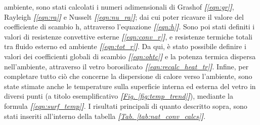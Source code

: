 \documentclass[a4paper,10pt]{article}                                                                                       %
\begin{document}
  ambiente, sono stati calcolati i numeri adimensionali di Grashof \textit{\textbf{[}\ref{eqn:gr}\textbf{]}}, Rayleigh
  \textit{\textbf{[}\ref{eqn:ra}\textbf{]}} e Nusselt \textit{\textbf{[}\ref{eqn:nu_ra}\textbf{]}}; dai cui poter
  ricavare il valore del coefficiente di scambio h, attraverso l'equazione \textit{\textbf{[}\ref{eqn:h}\textbf{]}}.
  Sono poi stati definiti i valori di resistenze convettive esterne \textit{\textbf{[}\ref{eqn:conv_r}\textbf{]}}, e
  resistenze termiche totali tra fluido esterno ed ambiente \textit{\textbf{[}\ref{eqn:tot_r}\textbf{]}}. Da qui, è
  stato possibile definire i valori dei coefficienti globali di scambio
  \textit{\textbf{[}\ref{eqn:ohtc}\textbf{]}} e la potenza termica dispersa nell'ambiente, attraverso il vetro
  borosilicato \textit{\textbf{[}\ref{eqn:recalc_heat_tr}\textbf{]}}. Infine, per completare tutto ciò che concerne
  la dispersione di calore verso l'ambiente, sono state stimate anche le temperature sulla superficie interna ed
  esterna del vetro in diversi punti (a titolo esemplificativo
  \textit{\textbf{[}\hyperref[fig:temp_trend]{Fig. }\ref{fig:temp_trend}\textbf{]}}), mediante la formula
  \textit{\textbf{[}\ref{eqn:surf_temp}\textbf{]}}. I risultati principali di quanto descritto sopra, sono stati
  inseriti all'interno della tabella
  \textit{\textbf{[}\hyperref[tab:nat_conv_calcs]{Tab. }\ref{tab:nat_conv_calcs}\textbf{]}}.
\end{document}
